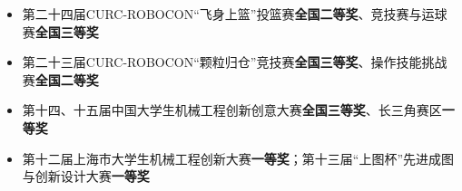 \documentclass{resume}
\begin{document}
\begin{itemize}
  \item 第二十四届CURC-ROBOCON“飞身上篮”投篮赛\textbf{全国二等奖}、竞技赛与运球赛\textbf{全国三等奖}
  \item 第二十三届CURC-ROBOCON“颗粒归仓”竞技赛\textbf{全国三等奖}、操作技能挑战赛\textbf{全国二等奖}
  \item 第十四、十五届中国大学生机械工程创新创意大赛\textbf{全国三等奖}、长三角赛区\textbf{一等奖}
  \item 第十二届上海市大学生机械工程创新大赛\textbf{一等奖}；第十三届“上图杯”先进成图与创新设计大赛\textbf{一等奖}
\end{itemize}
\end{document}
